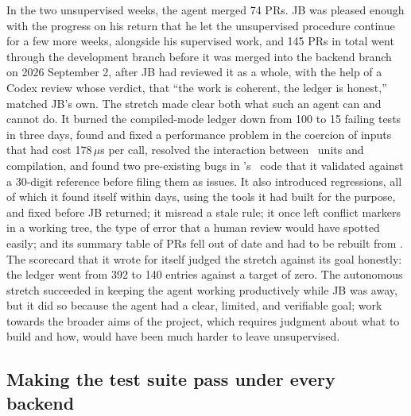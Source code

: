 In the two unsupervised weeks, the agent merged 74 PRs. JB was pleased
enough with the progress on his return that he let the unsupervised
procedure continue for a few more weeks, alongside his supervised work,
and 145 PRs in total went through the development branch before it was
merged into the backend branch on 2026 September 2, after JB had
reviewed it as a whole, with the help of a Codex review whose verdict,
that ``the work is coherent, the ledger is honest,'' matched JB's own.
The stretch made clear both what such an agent can and cannot do. It
burned the compiled-mode ledger down from 100 to 15 failing tests in
three days, found and fixed a performance problem in the coercion of
inputs that had cost 178\,$\mu$s per call, resolved the interaction
between \astropy\ units and compilation, and found two pre-existing bugs
in \galpy's \numpy\ code that it validated against a 30-digit reference
before filing them as issues. It also introduced regressions, all of
which it found itself within days, using the tools it had built for the
purpose, and fixed before JB returned; it misread a stale rule; it once
left conflict markers in a working tree, the type of error that a human
review would have spotted easily; and its summary table of PRs fell out
of date and had to be rebuilt from \github. The scorecard that it wrote
for itself judged the stretch against its goal honestly: the ledger
went from 392 to 140 entries against a target of zero. The autonomous
stretch succeeded in keeping the agent working productively while JB
was away, but it did so because the agent had a clear, limited, and
verifiable goal; work towards the broader aims of the project, which
requires judgment about what to build and how, would have been much
harder to leave unsupervised.

\subsection{Making the test suite pass under every backend}\label{sec:process-ledger}

